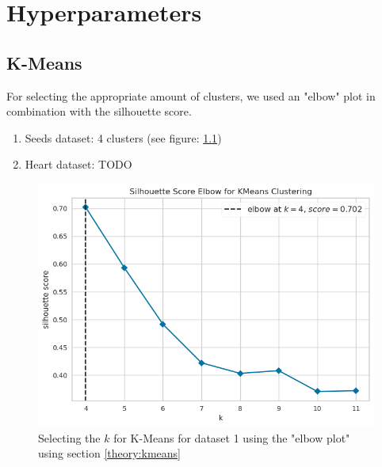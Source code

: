 \chapter{Hyperparameters}
\section{K-Means}
For selecting the appropriate amount of clusters, we used an "elbow" plot in combination with the silhouette score.
\begin{enumerate}
  \item Seeds dataset: 4 clusters (see figure: \ref{hyperparameters:k-means-dataset1})
  \item Heart dataset: TODO
\end{enumerate}
\begin{figure}
  \includegraphics{Appendix/parameter-selection/selecting-k.png}
  \caption{Selecting the $k$ for K-Means for dataset 1 using the "elbow plot" using section \ref{theory:kmeans}}
  \label{hyperparameters:k-means-dataset1}
\end{figure}